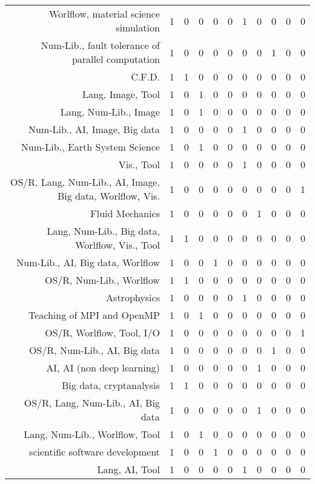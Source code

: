 {\begin{landscape}
\begin{longtable}[htb]{r|c|c|c|c|c|c|c|c|c|c}
{Worlflow, material science simulation} & 1 & 0 & 0 & 0 & 0 & 1 & 0 & 0 & 0 & 0 \\%
{Num-Lib., fault tolerance of parallel computation} & 1 & 0 & 0 & 0 & 0 & 0 & 0 & 1 & 0 & 0 \\%
{C.F.D.} & 1 & 1 & 0 & 0 & 0 & 0 & 0 & 0 & 0 & 0 \\%
{Lang, Image, Tool} & 1 & 0 & 1 & 0 & 0 & 0 & 0 & 0 & 0 & 0 \\%
{Lang, Num-Lib., Image} & 1 & 0 & 1 & 0 & 0 & 0 & 0 & 0 & 0 & 0 \\%
{Num-Lib., AI, Image, Big data} & 1 & 0 & 0 & 0 & 0 & 1 & 0 & 0 & 0 & 0 \\%
{Num-Lib., Earth System Science} & 1 & 0 & 1 & 0 & 0 & 0 & 0 & 0 & 0 & 0 \\%
{Vis., Tool} & 1 & 0 & 0 & 0 & 0 & 1 & 0 & 0 & 0 & 0 \\%
{OS/R, Lang, Num-Lib., AI, Image, Big data, Worlflow, Vis.} & 1 & 0 & 0 & 0 & 0 & 0 & 0 & 0 & 0 & 1 \\%
{Fluid Mechanics} & 1 & 0 & 0 & 0 & 0 & 0 & 1 & 0 & 0 & 0 \\%
{Lang, Num-Lib., Big data, Worlflow, Vis., Tool} & 1 & 1 & 0 & 0 & 0 & 0 & 0 & 0 & 0 & 0 \\%
{Num-Lib., AI, Big data, Worlflow} & 1 & 0 & 0 & 1 & 0 & 0 & 0 & 0 & 0 & 0 \\%
{OS/R, Num-Lib., Worlflow} & 1 & 1 & 0 & 0 & 0 & 0 & 0 & 0 & 0 & 0 \\%
{Astrophysics} & 1 & 0 & 0 & 0 & 0 & 1 & 0 & 0 & 0 & 0 \\%
{Teaching of MPI and OpenMP} & 1 & 0 & 1 & 0 & 0 & 0 & 0 & 0 & 0 & 0 \\%
{OS/R, Worlflow, Tool, I/O} & 1 & 0 & 0 & 0 & 0 & 0 & 0 & 0 & 0 & 1 \\%
{OS/R, Num-Lib., AI, Big data} & 1 & 0 & 0 & 0 & 0 & 0 & 0 & 1 & 0 & 0 \\%
{AI, AI (non deep learning)} & 1 & 0 & 0 & 0 & 0 & 0 & 1 & 0 & 0 & 0 \\%
{Big data, cryptanalysis} & 1 & 1 & 0 & 0 & 0 & 0 & 0 & 0 & 0 & 0 \\%
{OS/R, Lang, Num-Lib., AI, Big data} & 1 & 0 & 0 & 0 & 0 & 0 & 1 & 0 & 0 & 0 \\%
{Lang, Num-Lib., Worlflow, Tool} & 1 & 0 & 1 & 0 & 0 & 0 & 0 & 0 & 0 & 0 \\%
{scientific software development} & 1 & 0 & 0 & 1 & 0 & 0 & 0 & 0 & 0 & 0 \\%
{Lang, AI, Tool} & 1 & 0 & 0 & 0 & 0 & 1 & 0 & 0 & 0 & 0 \\%

\end{longtable}
\end{landscape}}
